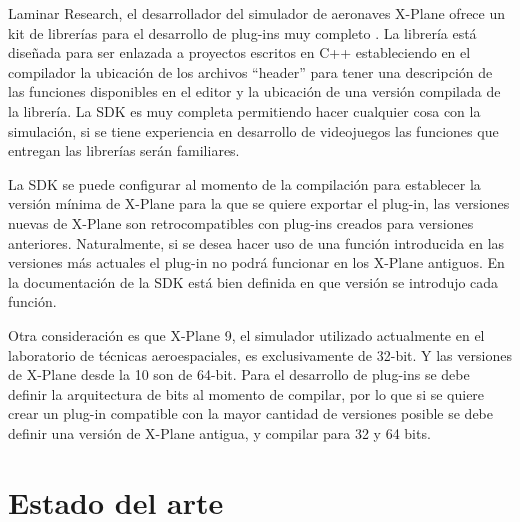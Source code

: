 Laminar Research, el desarrollador del simulador de aeronaves X-Plane ofrece un kit de librerías para el desarrollo de plug-ins muy completo \cite{xplane-sdk}. La librería está diseñada para ser enlazada a proyectos escritos en C++ estableciendo en el compilador la ubicación de los archivos ``header'' para tener una descripción de las funciones disponibles en el editor y la ubicación de una versión compilada de la librería. La SDK es muy completa permitiendo hacer cualquier cosa con la simulación, si se tiene experiencia en desarrollo de videojuegos las funciones que entregan las librerías serán familiares.

La SDK se puede configurar al momento de la compilación para establecer la versión mínima de X-Plane para la que se quiere exportar el plug-in, las versiones nuevas de X-Plane son retrocompatibles con plug-ins creados para versiones anteriores. Naturalmente, si se desea hacer uso de una función introducida en las versiones más actuales el plug-in no podrá funcionar en los X-Plane antiguos. En la documentación de la SDK está bien definida en que versión se introdujo cada función.

Otra consideración es que X-Plane 9, el simulador utilizado actualmente en el laboratorio de técnicas aeroespaciales, es exclusivamente de 32-bit. Y las versiones de X-Plane desde la 10 son de 64-bit. Para el desarrollo de plug-ins se debe definir la arquitectura de bits al momento de compilar, por lo que si se quiere crear un plug-in compatible con la mayor cantidad de versiones posible se debe definir una versión de X-Plane antigua, y compilar para 32 y 64 bits.

\section{Estado del arte}
